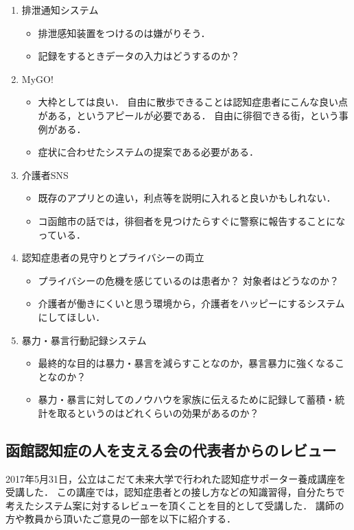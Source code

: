 \documentclass[../report]{subfiles}
\begin{document}
\begin{enumerate}
    \item[] 排泄通知システム
\begin{itemize}
    \item 排泄感知装置をつけるのは嫌がりそう．
    \item 記録をするときデータの入力はどうするのか？
\end{itemize}

    \item[] MyGO!
\begin{itemize}
    \item 大枠としては良い．
自由に散歩できることは認知症患者にこんな良い点がある，というアピールが必要である．
自由に徘徊できる街，という事例がある\cite{haikai}．
    \item 症状に合わせたシステムの提案である必要がある．
\end{itemize}

    \item[] 介護者SNS
\begin{itemize}
    \item 既存のアプリとの違い，利点等を説明に入れると良いかもしれない．
    \item コ函館市の話では，徘徊者を見つけたらすぐに警察に報告することになっている．
\end{itemize}

    \item[] 認知症患者の見守りとプライバシーの両立
\begin{itemize}
    \item プライバシーの危機を感じているのは患者か？
対象者はどうなのか？
    \item 介護者が働きにくいと思う環境から，介護者をハッピーにするシステムにしてほしい．
\end{itemize}

    \item[] 暴力・暴言行動記録システム
\begin{itemize}
    \item 最終的な目的は暴力・暴言を減らすことなのか，暴言暴力に強くなることなのか？
    \item 暴力・暴言に対してのノウハウを家族に伝えるために記録して蓄積・統計を取るというのはどれくらいの効果があるのか？
\end{itemize}
\end{enumerate}


\subsection{函館認知症の人を支える会の代表者からのレビュー}
2017年5月31日，公立はこだて未来大学で行われた認知症サポーター養成講座を受講した．
この講座では，認知症患者との接し方などの知識習得，自分たちで考えたシステム案に対するレビューを頂くことを目的として受講した．
講師の方や教員から頂いたご意見の一部を以下に紹介する．
\end{document}
